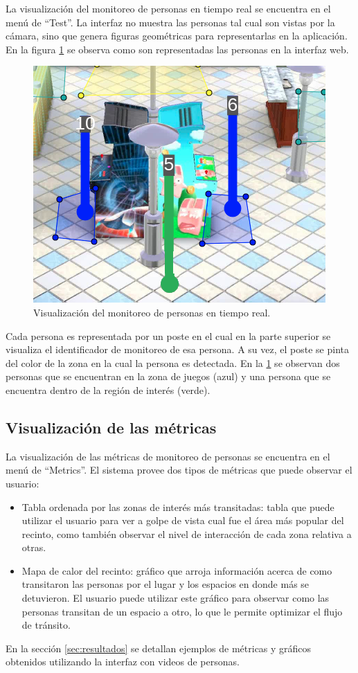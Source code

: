 La visualización del monitoreo de personas en tiempo real se encuentra en el menú de ``Test''. La interfaz no muestra las personas tal cual son vistas por la cámara, sino que genera figuras geométricas para representarlas en la aplicación. En la figura \ref{fig:visualizacionSeguimiento} se observa como son representadas las personas en la interfaz web.

\begin{figure}[ht]
	\centering
	\includegraphics[scale=.8]{./Figures/visualizacionSeguimiento.png}
	\caption{Visualización del monitoreo de personas en tiempo real.}
	\label{fig:visualizacionSeguimiento}
\end{figure}

Cada persona es representada por un poste en el cual en la parte superior se visualiza el identificador de monitoreo de esa persona. A su vez, el poste se pinta del color de la zona en la cual la persona es detectada. En la \ref{fig:visualizacionSeguimiento} se observan dos personas que se encuentran en la zona de juegos (azul) y una persona que se encuentra dentro de la región de interés (verde).

\subsection{Visualización de las métricas}

La visualización de las métricas de monitoreo de personas se encuentra en el menú de ``Metrics''. El sistema provee dos tipos de métricas que puede observar el usuario:

\begin{itemize}
\item Tabla ordenada por las zonas de interés más transitadas: tabla que puede utilizar el usuario para ver a golpe de vista cual fue el área más popular del recinto, como también observar el nivel de interacción de cada zona relativa a otras.
\item Mapa de calor del recinto: gráfico que arroja información acerca de como transitaron las personas por el lugar y los espacios en donde más se detuvieron. El usuario puede utilizar este gráfico para observar como las personas transitan de un espacio a otro, lo que le permite optimizar el flujo de tránsito.
\end{itemize}

En la sección \ref{sec:resultados} se detallan ejemplos de métricas y gráficos obtenidos utilizando la interfaz con videos de personas.